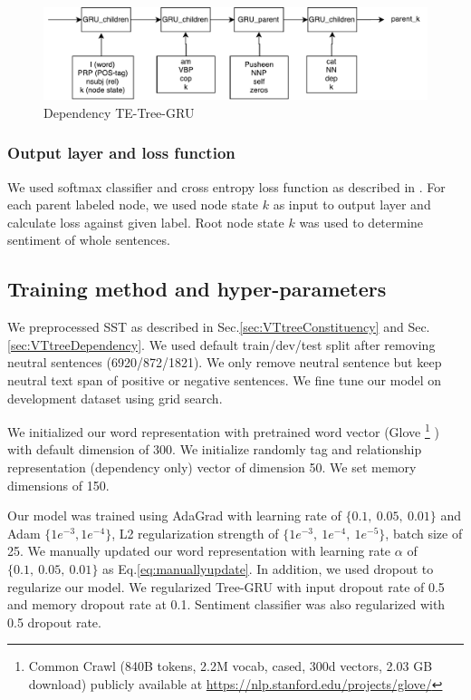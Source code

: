 \begin{figure}[H]
    \centering
    \includegraphics[width=0.9\linewidth]{figure/dependencyvtgru}
    \caption[Dependency TE-Tree-GRU]{Dependency TE-Tree-GRU}
    \label{fig:dependencyvtgru}
\end{figure}

\subsubsection{Output layer and loss function}
We used softmax classifier and cross entropy loss function as described in \cite{treeLSTM}.  For each parent labeled node, we used node state $k$ as input to output layer and calculate loss against given label. Root node state $k$ was used to determine sentiment of whole sentences.
\subsection{Training method and hyper-parameters}
We preprocessed SST as described in Sec.\ref{sec:VTtreeConstituency} and Sec.\ref{sec:VTtreeDependency}. We used default train/dev/test split after removing neutral sentences (6920/872/1821). We only remove neutral sentence but keep neutral text span of positive or negative sentences. We fine tune our model on development dataset using grid search.

We initialized our word representation with pretrained word vector (Glove \footnote{Common Crawl (840B tokens, 2.2M vocab, cased, 300d vectors, 2.03 GB download) publicly available at \url{https://nlp.stanford.edu/projects/glove/}} \cite{glove})  with default dimension of 300.  We initialize randomly tag and relationship representation (dependency only) vector of dimension 50. We set memory dimensions of 150. 

Our model was trained using AdaGrad \cite{duchi2011adaptive} with learning rate of $\{0.1,~ 0.05,~ 0.01\}$ and Adam $\{1e^{-3}, 1e^{-4}\}$, L2 regularization strength of $\{1e^{-3},~ 1e^{-4}, ~ 1e^{-5} \}$, batch size of 25. We manually updated our word representation with learning rate $\alpha$ of $\{0.1,~0.05, ~0.01\}$ as Eq.\ref{eq:manuallyupdate}. In addition, we used dropout \cite{krizhevsky2012imagenet} to regularize our model. We regularized Tree-GRU with input dropout rate of 0.5 and memory dropout rate at 0.1. Sentiment classifier was also regularized with 0.5 dropout rate. 

